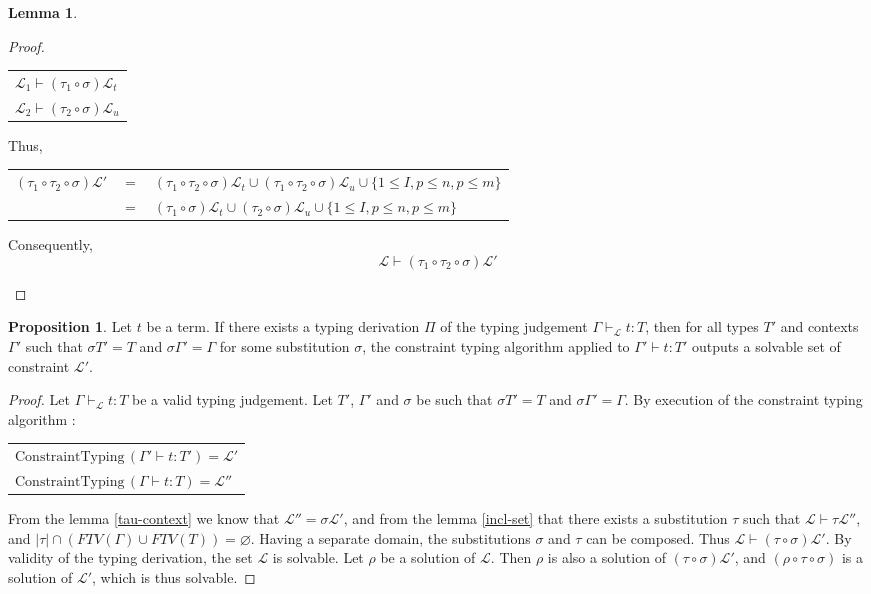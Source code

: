 \documentclass[10pt]{article}
\theoremstyle{plain}
\theoremstyle{definition}
\newtheorem{prop}{Proposition}[section]
\newtheorem{lemma}{Lemma}[section]
\begin{document}
\begin{lemma}
\begin{proof}
\begin{itemize}
\begin{center}
			 		\begin{tabular}{l}
			 			$\mathcal{L}_1 \vdash (\tau_1 \circ \sigma) \mathcal{L}_t$ \\
			 			$\mathcal{L}_2 \vdash (\tau_2 \circ \sigma) \mathcal{L}_u$
			 		\end{tabular}
			 		\end{center}
				Thus,
			 		\begin{center}
			 		\begin{tabular}{lcl}
			 			$(\tau_1 \circ \tau_2 \circ \sigma) \mathcal{L}'$ & $=$ & 
				 			$(\tau_1 \circ \tau_2 \circ \sigma) \mathcal{L}_t \cup (\tau_1 \circ \tau_2 \circ \sigma) \mathcal{L}_u \cup
				 				\{1 \le I, p \le n, p \le m\}$ \\
				 		& $=$ & $(\tau_1 \circ \sigma) \mathcal{L}_t \cup (\tau_2 \circ \sigma) \mathcal{L}_u \cup
				 				\{1 \le I, p \le n, p \le m\}$
			 		\end{tabular}
			 		\end{center}
			 	Consequently,
			 		$$ \mathcal{L} \vdash (\tau_1 \circ \tau_2 \circ \sigma) \mathcal{L'} $$
		\end{itemize}
	\end{proof}
\end{lemma}

\begin{prop} Let $t$ be a term. If there exists a typing derivation $\Pi$ of the typing judgement
	$\Gamma \vdash_\mathcal{L} t : T$, then for all types $T'$ and contexts $\Gamma'$ such that $\sigma T' = T$ and $\sigma \Gamma' = \Gamma$
	for some substitution $\sigma$, the constraint typing algorithm applied to $\Gamma' \vdash t : T'$ outputs a solvable set of
	constraint $\mathcal{L'}$.
	
	\begin{proof}
		Let $\Gamma \vdash_\mathcal{L} t : T$ be a valid typing judgement. Let $T'$, $\Gamma'$ and $\sigma$ be such that
		$\sigma T' = T$ and $\sigma \Gamma' = \Gamma$. By execution of the constraint typing algorithm :
			\begin{center}
			\begin{tabular}{l}
				$\text{ConstraintTyping} \, (\Gamma' \vdash t : T') = \mathcal{L'}$ \\
				$\text{ConstraintTyping} \, (\Gamma \vdash t : T) = \mathcal{L''}$
			\end{tabular}
			\end{center}
		From the lemma \ref{tau-context} we know that $\mathcal{L''} = \sigma \mathcal{L'}$, and from the lemma \ref{incl-set} that
		there exists a substitution $\tau$ such that $\mathcal{L} \vdash \tau \mathcal{L''}$, and
		$|\tau| \cap (FTV(\Gamma) \cup FTV(T)) = \varnothing$. Having a separate domain, the substitutions $\sigma$ and $\tau$ can be composed.
		Thus $\mathcal{L} \vdash (\tau \circ \sigma) \mathcal{L'}$.
		By validity of the typing derivation, the set $\mathcal{L}$ is solvable.
		Let $\rho$ be a solution of $\mathcal{L}$. Then $\rho$ is also a solution of $(\tau \circ \sigma) \mathcal{L'}$, and
		$(\rho \circ \tau \circ \sigma)$ is a solution of $\mathcal{L'}$, which is thus solvable.
	\end{proof}
\end{prop}
 
\end{document}
